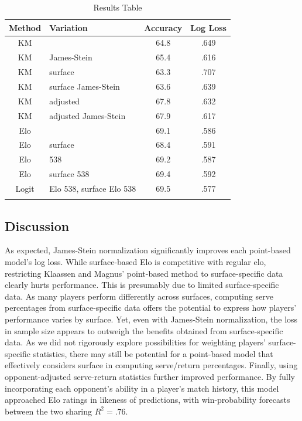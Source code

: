 \documentclass[chapterprefix=false]{report}
\begin{document}
\begin{center}
\begin{table}[H]
        \caption{Results Table}
        \centering
        \begin{tabular}{@{}clcc@{}}
            \toprule
            Method & Variation & Accuracy & Log Loss \\\midrule

            KM & & 64.8 & .649  \\\addlinespace
            
            KM & James-Stein & 65.4 & .616
  \\\addlinespace
 KM & surface & 63.3 & .707
  \\\addlinespace
 KM & surface James-Stein & 63.6 & .639 \\\addlinespace
 KM & adjusted & 67.8 & .632 \\\addlinespace
 KM & adjusted James-Stein & 67.9 & .617 \\\addlinespace
 Elo &  & 69.1 & .586 \\\addlinespace
 Elo & surface & 68.4 & .591 \\\addlinespace
 Elo & 538 & 69.2 & .587 \\\addlinespace
 Elo & surface 538 & 69.4 & .592 \\\addlinespace
 Logit & Elo 538, surface Elo 538 & 69.5 & .577 \\\addlinespace
            \bottomrule
        \end{tabular}
    \end{table}
    \end{center}

\subsection{Discussion}

As expected, James-Stein normalization significantly improves each point-based model's log loss. While surface-based Elo is competitive with regular elo, restricting Klaassen and Magnus' point-based method to surface-specific data clearly hurts performance. This is presumably due to limited surface-specific data. As many players perform differently across surfaces, computing serve percentages from surface-specific data offers the potential to express how players' performance varies by surface. Yet, even with James-Stein normalization, the loss in sample size appears to outweigh the benefits obtained from surface-specific data. As we did not rigorously explore possibilities for weighting players' surface-specific statistics, there may still be potential for a point-based model that effectively considers surface in computing serve/return percentages. Finally, using opponent-adjusted serve-return statistics further improved performance. By fully incorporating each opponent's ability in a player's match history, this model approached Elo ratings in likeness of predictions, with win-probability forecasts between the two sharing $R^2=.76$.
\end{document}
